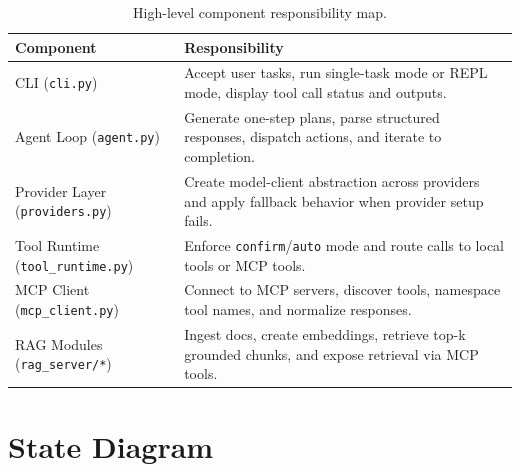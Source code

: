 \documentclass[11pt, letterpaper]{article}
\begin{document}
\begin{table}[H]
\centering\small
\begin{tabularx}{\textwidth}{@{}l X@{}}
\toprule
\textbf{Component} & \textbf{Responsibility} \\
\midrule
CLI (\texttt{cli.py}) & Accept user tasks, run single-task mode or REPL mode, display tool call status and outputs. \\
Agent Loop (\texttt{agent.py}) & Generate one-step plans, parse structured responses, dispatch actions, and iterate to completion. \\
Provider Layer (\texttt{providers.py}) & Create model-client abstraction across providers and apply fallback behavior when provider setup fails. \\
Tool Runtime (\texttt{tool\_runtime.py}) & Enforce \texttt{confirm}/\texttt{auto} mode and route calls to local tools or MCP tools. \\
MCP Client (\texttt{mcp\_client.py}) & Connect to MCP servers, discover tools, namespace tool names, and normalize responses. \\
RAG Modules (\texttt{rag\_server/*}) & Ingest docs, create embeddings, retrieve top-k grounded chunks, and expose retrieval via MCP tools. \\
\bottomrule
\end{tabularx}
\caption{High-level component responsibility map.}
\end{table}

\section{State Diagram}
\end{document}
